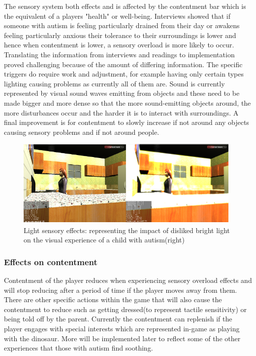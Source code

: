 \documentclass[11pt]{report}
\begin{document}
The sensory system both effects and is affected by the contentment bar which is the equivalent of a players "health" or well-being. Interviews showed that if someone with autism is feeling particularly drained from their day or
awakens feeling particularly anxious their tolerance to their surroundings is lower and hence when contentment is lower, a sensory overload is more likely to occur. Translating the information from interviews and readings to
implementation proved challenging because of the amount of differing information. The specific triggers do require work and adjustment, for example having only certain types lighting causing problems as currently all of them
are. Sound is currently represented by visual sound waves emitting from objects and these need to be made bigger and more dense so that the more sound-emitting objects around, the more disturbances occur and the harder
it is to interact with surroundings. A final improvement is for contentment to slowly increase if not around any objects causing sensory problems and if not around people.

\begin{figure}[H]
\centering
\includegraphics[width=110mm]{images/old_sensoryeffects.png}
\caption{Light sensory effects: representing the impact of disliked bright
light on the visual experience of a child with autism(right)}
\label{old_sensoryeffects}
\end{figure}

\subsubsection{Effects on contentment}
Contentment of the player reduces when experiencing sensory overload effects and will stop reducing after a period of time if the player moves away from them. There are other specific actions within the game that will also cause the
contentment to reduce such as getting dressed(to represent tactile sensitivity) or being told off by the parent. Currently the contentment can replenish if the player engages with special interests which are represented in-game as playing with the dinosaur. More will be implemented later to reflect some of the other experiences that those with autism find soothing.
\end{document}
